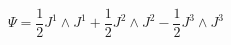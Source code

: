 \begin{equation}
\Psi=\frac{1}{2}J^1\wedge J^1+\frac{1}{2}J^2\wedge J^2 
-\frac{1}{2}J^3\wedge J^3
\end{equation}


